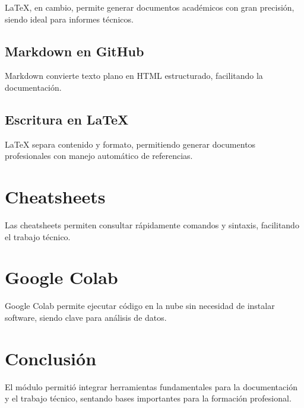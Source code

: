 \documentclass[runningheads]{llncs}
\begin{document}
LaTeX, en cambio, permite generar documentos académicos con gran precisión, siendo ideal para informes técnicos.

\subsection{Markdown en GitHub}

Markdown convierte texto plano en HTML estructurado, facilitando la documentación.

\subsection{Escritura en LaTeX}

LaTeX separa contenido y formato, permitiendo generar documentos profesionales con manejo automático de referencias.

\section{Cheatsheets}

Las cheatsheets permiten consultar rápidamente comandos y sintaxis, facilitando el trabajo técnico.

\section{Google Colab}

Google Colab permite ejecutar código en la nube sin necesidad de instalar software, siendo clave para análisis de datos.

\section{Conclusión}

El módulo permitió integrar herramientas fundamentales para la documentación y el trabajo técnico, sentando bases importantes para la formación profesional.



\end{document}
